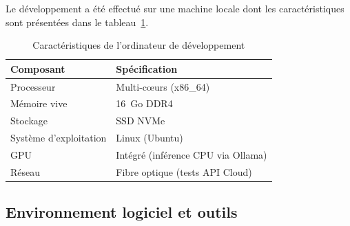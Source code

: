 Le développement a été effectué sur une machine locale dont les caractéristiques sont
présentées dans le tableau~\ref{tab:hardware}.

\begin{table}[H]
    \centering
    \caption{Caractéristiques de l'ordinateur de développement}
    \label{tab:hardware}
    \small
    \begin{tabular}{p{4cm} p{8cm}}
        \toprule
        \textbf{Composant} & \textbf{Spécification} \\
        \midrule
        Processeur & Multi-cœurs (x86\_64) \\[3pt]
        Mémoire vive & 16~Go DDR4 \\[3pt]
        Stockage & SSD NVMe \\[3pt]
        Système d'exploitation & Linux (Ubuntu) \\[3pt]
        GPU & Intégré (inférence CPU via Ollama) \\[3pt]
        Réseau & Fibre optique (tests API Cloud) \\
        \bottomrule
    \end{tabular}
\end{table}

\subsection{Environnement logiciel et outils}

